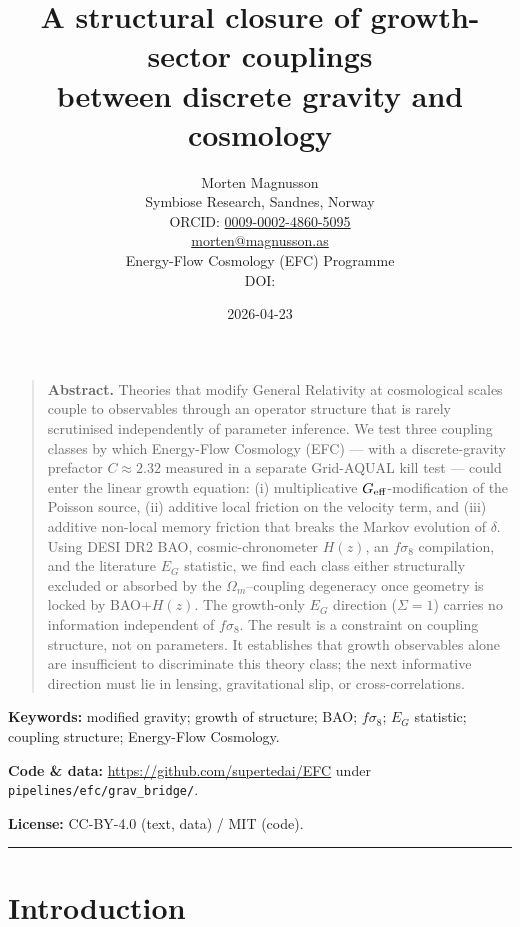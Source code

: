 \documentclass[11pt,a4paper]{article}
\title{\color{efcblue}\bfseries A structural closure of growth-sector couplings \\ between discrete gravity and cosmology}
\author{Morten Magnusson \\[2pt]
        \small Symbiose Research, Sandnes, Norway \\
        \small ORCID: \href{https://orcid.org/0009-0002-4860-5095}{0009-0002-4860-5095} \\
        \small \href{mailto:morten@magnusson.as}{morten@magnusson.as} \\[2pt]
        \small Energy-Flow Cosmology (EFC) Programme \\[1pt]
        \small DOI: \href{https://doi.org/\paperdoi}{\paperdoi}}
\date{2026-04-23}
\begin{document}
\maketitle
\thispagestyle{fancy}

\vspace{-2em}

\begin{quote}\small
\textbf{Abstract.} Theories that modify General Relativity at cosmological scales couple to observables through an operator structure that is rarely scrutinised independently of parameter inference. We test three coupling classes by which Energy-Flow Cosmology (EFC) --- with a discrete-gravity prefactor $C \approx 2.32$ measured in a separate Grid-AQUAL kill test --- could enter the linear growth equation: (i) multiplicative $G_{\rm eff}$-modification of the Poisson source, (ii) additive local friction on the velocity term, and (iii) additive non-local memory friction that breaks the Markov evolution of $\delta$. Using DESI DR2 BAO, cosmic-chronometer $H(z)$, an $f\sigma_8$ compilation, and the literature $E_G$ statistic, we find each class either structurally excluded or absorbed by the $\Omega_m$--coupling degeneracy once geometry is locked by BAO+$H(z)$. The growth-only $E_G$ direction ($\Sigma = 1$) carries no information independent of $f\sigma_8$. The result is a constraint on coupling structure, not on parameters. It establishes that growth observables alone are insufficient to discriminate this theory class; the next informative direction must lie in lensing, gravitational slip, or cross-correlations.
\end{quote}

\vspace{0.5em}

\noindent\textbf{Keywords:} modified gravity; growth of structure; BAO; $f\sigma_8$; $E_G$ statistic; coupling structure; Energy-Flow Cosmology.

\begin{sloppypar}
\noindent\textbf{Code \& data:} \url{https://github.com/supertedai/EFC} under \texttt{pipelines/efc/grav\_bridge/}.
\end{sloppypar}

\noindent\textbf{License:} CC-BY-4.0 (text, data) / MIT (code).

\vspace{1em}
\color{rulegray}\hrule\color{black}

\section{Introduction}
\end{document}
